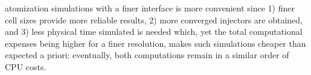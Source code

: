 atomization simulations with a finer interface is more convenient since 1) finer cell sizes provide more reliable results, 2) more converged injectors are obtained, and 3) less physical time simulated is needed which, yet the total computational expenses being higher for a finer resolution, makes such simulations cheaper than expected a priori: eventually, both computations remain in a similar order of CPU costs.

